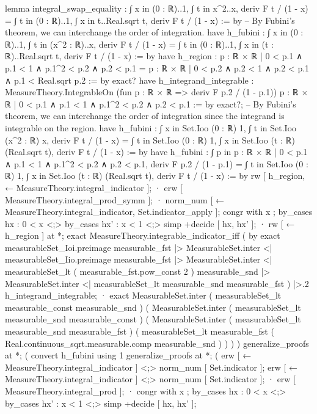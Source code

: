 lemma integral_swap_equality : ∫ x in (0 : ℝ)..1, ∫ t in x^2..x, deriv F t / (1 - x) = ∫ t in (0 : ℝ)..1, ∫ x in t..Real.sqrt t, deriv F t / (1 - x) := by
  -- By Fubini's theorem, we can interchange the order of integration.
  have h_fubini : ∫ x in (0 : ℝ)..1, ∫ t in (x^2 : ℝ)..x, deriv F t / (1 - x) = ∫ t in (0 : ℝ)..1, ∫ x in (t : ℝ)..Real.sqrt t, deriv F t / (1 - x) := by
    have h_region : {p : ℝ × ℝ | 0 < p.1 ∧ p.1 < 1 ∧ p.1^2 < p.2 ∧ p.2 < p.1} = {p : ℝ × ℝ | 0 < p.2 ∧ p.2 < 1 ∧ p.2 < p.1 ∧ p.1 < Real.sqrt p.2} := by
      exact?
    have h_integrand_integrable : MeasureTheory.IntegrableOn (fun p : ℝ × ℝ => deriv F p.2 / (1 - p.1)) {p : ℝ × ℝ | 0 < p.1 ∧ p.1 < 1 ∧ p.1^2 < p.2 ∧ p.2 < p.1} := by
      exact?;
    -- By Fubini's theorem, we can interchange the order of integration since the integrand is integrable on the region.
    have h_fubini : ∫ x in Set.Ioo (0 : ℝ) 1, ∫ t in Set.Ioo (x^2 : ℝ) x, deriv F t / (1 - x) = ∫ t in Set.Ioo (0 : ℝ) 1, ∫ x in Set.Ioo (t : ℝ) (Real.sqrt t), deriv F t / (1 - x) := by
      have h_fubini : ∫ p in {p : ℝ × ℝ | 0 < p.1 ∧ p.1 < 1 ∧ p.1^2 < p.2 ∧ p.2 < p.1}, deriv F p.2 / (1 - p.1) = ∫ t in Set.Ioo (0 : ℝ) 1, ∫ x in Set.Ioo (t : ℝ) (Real.sqrt t), deriv F t / (1 - x) := by
        rw [ h_region, ← MeasureTheory.integral_indicator ];
        · erw [ MeasureTheory.integral_prod_symm ];
          · norm_num [ ← MeasureTheory.integral_indicator, Set.indicator_apply ];
            congr with x ; by_cases hx : 0 < x <;> by_cases hx' : x < 1 <;> simp +decide [ hx, hx' ];
          · rw [ ← h_region ] at *; exact MeasureTheory.integrable_indicator_iff ( by exact measurableSet_Ioi.preimage measurable_fst |> MeasurableSet.inter <| measurableSet_Iio.preimage measurable_fst |> MeasurableSet.inter <| measurableSet_lt ( measurable_fst.pow_const 2 ) measurable_snd |> MeasurableSet.inter <| measurableSet_lt measurable_snd measurable_fst ) |>.2 h_integrand_integrable;
        · exact MeasurableSet.inter ( measurableSet_lt measurable_const measurable_snd ) ( MeasurableSet.inter ( measurableSet_lt measurable_snd measurable_const ) ( MeasurableSet.inter ( measurableSet_lt measurable_snd measurable_fst ) ( measurableSet_lt measurable_fst ( Real.continuous_sqrt.measurable.comp measurable_snd ) ) ) )
      generalize_proofs at *; (
      convert h_fubini using 1
      generalize_proofs at *; (
      erw [ ← MeasureTheory.integral_indicator ] <;> norm_num [ Set.indicator ];
      erw [ ← MeasureTheory.integral_indicator ] <;> norm_num [ Set.indicator ];
      · erw [ MeasureTheory.integral_prod ];
        · congr with x ; by_cases hx : 0 < x <;> by_cases hx' : x < 1 <;> simp +decide [ hx, hx' ];

